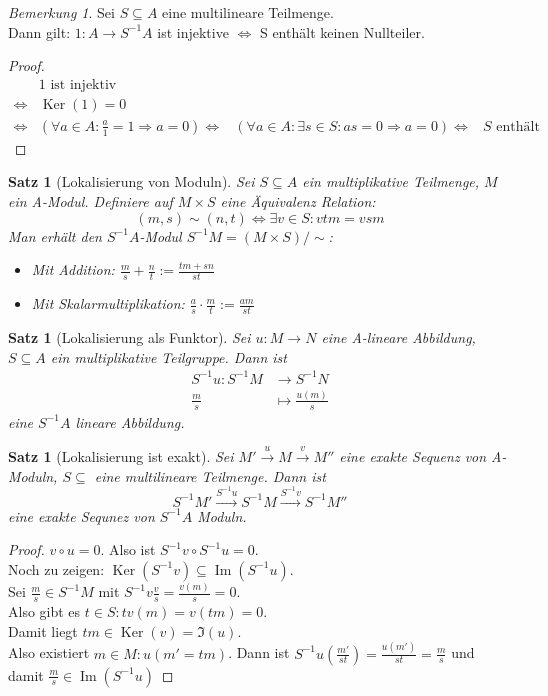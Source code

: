 \documentclass[10pt,a4paper]{article}
\newcommand{\Ker}{\ensuremath{\operatorname{Ker}}}
\newcommand{\Img}{\ensuremath{\operatorname{Im}}}
\newcounter{thm}[section]
\theoremstyle{definition}
\theoremstyle{plain}
\newtheorem{satz}[thm]{Satz}
\theoremstyle{remark}
\newtheorem{bem}[thm]{Bemerkung}
\begin{document}
\begin{bem}\label{405bem}
	Sei $S\subseteq A$ eine multilineare Teilmenge.\\
	Dann gilt: $1:A\rightarrow S^{-1}A$ ist injektive $\Leftrightarrow$ S enthält keinen Nullteiler.
\end{bem}
\begin{proof}
	\begin{align*}
	&1\text{ ist injektiv }\\
	\Leftrightarrow&\Ker(1)=0\\
	\Leftrightarrow&(\forall a\in A:\frac{a}{1}=1\Rightarrow a=0)
	\Leftrightarrow&(\forall a\in A:\exists s\in S:as=0\Rightarrow a=0)
	\Leftrightarrow&\text{$S$ enthält eine Nullteiler}
	\end{align*}
\end{proof}
\begin{satz}[Lokalisierung von Moduln]
	Sei $S\subseteq A$ ein multiplikative Teilmenge, $M$ ein A-Modul. Definiere auf $M\times S$ eine Äquivalenz Relation:
	\[(m,s)\sim (n,t)\Leftrightarrow\exists v\in S:vtm=vsm\]
	Man erhält den $S^{-1}A$-Modul $S^{-1}M=(M\times S)/\sim$:
	\begin{itemize}
		\item Mit Addition: $\frac{m}{s}+\frac{n}{t}:=\frac{tm+sn}{st}$
		\item Mit Skalarmultiplikation: $\frac{a}{s}\cdot \frac{m}{t}:=\frac{am}{st}$
	\end{itemize}
\end{satz}
\begin{satz}[Lokalisierung als Funktor]
	Sei $u:M\rightarrow  N$ eine A-lineare Abbildung, $S\subseteq A$ ein multiplikative Teilgruppe. Dann ist
	\begin{align*}
	S^{-1}u:S^{-1}M&\rightarrow S^{-1}N\\
	\frac{m}{s}&\mapsto \frac{u(m)}{s}
	\end{align*}
	eine $S^{-1}A$ lineare Abbildung.
\end{satz}
\begin{satz}[Lokalisierung ist exakt]\label{408satzLok}
	Sei $M'\xrightarrow{u}M\xrightarrow{v}M''$ eine exakte Sequenz von A-Moduln, $S\subseteq$ eine multilineare Teilmenge. Dann ist
	\[S^{-1}M'\xrightarrow{S^{-1}u}S^{-1}M\xrightarrow{S^{-1}v}S^{-1}M''\]
	eine exakte Sequnez von $S^{-1}A$ Moduln.
\end{satz}
\begin{proof}
	$v\circ u=0$. Also ist $S^{-1}v\circ S^{-1}u=0$.\\
	Noch zu zeigen: $\Ker(S^{-1}v)\subseteq \Img(S^{-1}u)$.\\
	Sei $\frac{m}{s}\in S^{-1}M$ mit $S^{-1}v\frac{v}{s}=\frac{v(m)}{s}=0$.\\
	Also gibt es $t\in S:tv(m)=v(tm)=0$.\\
	Damit liegt $tm\in\Ker(v)=\Im(u)$.\\
	Also existiert $m\in M:u(m'=tm)$.
	Dann ist $S^{-1}u\left(\frac{m'}{st}\right)=\frac{u(m')}{st}=\frac{m}{s}$ und damit $\frac{m}{s}\in\Img(S^{-1}u)$
\end{proof}
\end{document}

